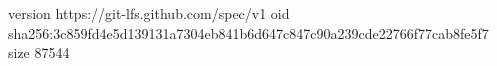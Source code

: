 version https://git-lfs.github.com/spec/v1
oid sha256:3c859fd4e5d139131a7304eb841b6d647c847c90a239cde22766f77cab8fe5f7
size 87544
